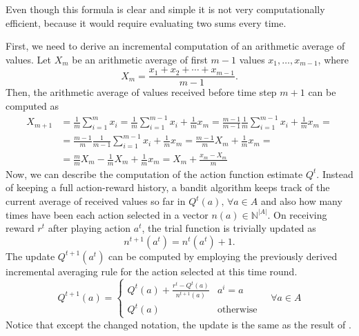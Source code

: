 \documentclass[../main.tex]{subfiles}
\begin{document}
Even though this formula is clear and simple it is not very computationally efficient, because it would require evaluating two sums every time.

First, we need to derive an incremental computation of an arithmetic average of values.
Let $X_{m}$ be an arithmetic average of first $m - 1$ values $x_1, \dots, x_{m - 1}$, where
\begin{equation}\label{bandit:learn:incrementalavg}
    X_{m} = \frac{x_1 + x_2 + \cdots + x_{m - 1}}{m - 1}.
\end{equation}
Then, the arithmetic average of values received before time step $m + 1$ can be computed as
\begin{equation}\label{bandit:learn:incrementalavg:derivation}
    \begin{split}
        X_{m+1} &= \frac{1}{m}\sum_{i = 1}^{m}x_i = \frac{1}{m}\sum_{i = 1}^{m - 1}x_i + \frac{1}{m}x_m = \frac{m - 1}{m - 1}\frac{1}{m}\sum_{i = 1}^{m - 1}x_i + \frac{1}{m}x_m =\\
        & = \frac{m - 1}{m}\frac{1}{m - 1}\sum_{i = 1}^{m - 1}x_i + \frac{1}{m}x_m = \frac{m - 1}{m}X_m + \frac{1}{m}x_m = \\
        & = \frac{m}{m}X_m - \frac{1}{m}X_m + \frac{1}{m}x_m = X_m + \frac{x_m - X_m}{m}
    \end{split}
\end{equation}
Now, we can describe the computation of the action function estimate $Q^t$.
Instead of keeping a full action-reward history, a bandit algorithm keeps track of the current average of received values so far in $Q^t(a) ,\, \forall a \in A$ and also how many times have been each action selected in a vector $n(a) \in \mathbb{N}^{\left|A\right|}$.
On receiving reward $r^t$ after playing action $a^t$, the trial function is trivially updated as
\begin{equation}
    n^{t+1}(a^t) = n^{t}(a^t) + 1.
\end{equation}
The update $Q^{t+1}(a^t)$ can be computed by employing the previously derived incremental averaging rule for the action selected at this time round.
\begin{equation}\label{bandit:learn:Qupdate}
    Q^{t+1}(a) = \begin{cases}Q^t(a) + \frac{r^t - Q^t(a)}{n^{t+1}(a)} & a^i = a \\ Q^t(a) & \text{otherwise}\end{cases} \quad \forall a \in A
\end{equation}
Notice that except the changed notation, the update is the same as the result of .
\end{document}
